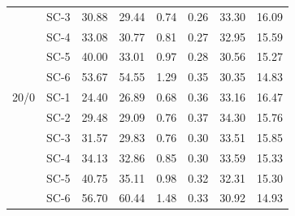\begin{table}[htbp]
{\begin{tabular}{ccrrrrrr}
     & SC-3 & 30.88 & 29.44 & 0.74 & 0.26 & 33.30 & 16.09 \\
     & SC-4 & 33.08 & 30.77 & 0.81 & 0.27 & 32.95 & 15.59 \\
     & SC-5 & 40.00 & 33.01 & 0.97 & 0.28 & 30.56 & 15.27 \\
     & SC-6 & 53.67 & 54.55 & 1.29 & 0.35 & 30.35 & 14.83 \\
    \midrule
    20/0 & SC-1 & 24.40 & 26.89 & 0.68 & 0.36 & 33.16 & 16.47 \\
     & SC-2 & 29.48 & 29.09 & 0.76 & 0.37 & 34.30 & 15.76 \\
     & SC-3 & 31.57 & 29.83 & 0.76 & 0.30 & 33.51 & 15.85 \\
     & SC-4 & 34.13 & 32.86 & 0.85 & 0.30 & 33.59 & 15.33 \\
     & SC-5 & 40.75 & 35.11 & 0.98 & 0.32 & 32.31 & 15.30 \\
     & SC-6 & 56.70 & 60.44 & 1.48 & 0.33 & 30.92 & 14.93 \\
    \bottomrule
    \end{tabular}}
  \label{tab:res_classes}
\end{table}

